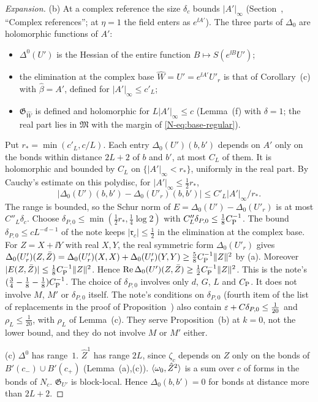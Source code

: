 \begin{proof}[Expansion]
(b) At a complex reference the size $\delta_c$ bounds $|A'|_\infty$ (Section~, ``Complex references''; at $\eta=1$ the field enters as $e^{\ii A'}$). The three parts of $\Delta_0$ are holomorphic functions of $A'$:
\begin{itemize}
\item $\Delta^0(U')$ is the Hessian of the entire function $B\mapsto S(e^{\ii B}U')$;
\item the elimination at the complex base $\hat W=U'=e^{\ii A'}U'_r$ is that of Corollary~(c) with $\hat\beta=A'$, defined for $|A'|_\infty\le c'_L$;
\item $\mathfrak G_{\hat W}$ is defined and holomorphic for $L|A'|_\infty\le c$ (Lemma~(f) with $\delta=1$; the real part lies in $\mathfrak M$ with the margin of \eqref{N-eq:base-regular}).
\end{itemize}
Put $r_*=\min(c'_L,c/L)$. Each entry $\Delta_0(U')(b,b')$ depends on $A'$ only on the bonds within distance $2L+2$ of $b$ and $b'$, at most $C_L$ of them. It is holomorphic and bounded by $C_L$ on $\{|A'|_\infty<r_*\}$, uniformly in the real part. By Cauchy's estimate on this polydisc, for $|A'|_\infty\le\frac12r_*$,
\[
|\Delta_0(U')(b,b')-\Delta_0(U'_r)(b,b')|\le C'_L|A'|_\infty/r_* .
\]
The range is bounded, so the Schur norm of $E=\Delta_0(U')-\Delta_0(U'_r)$ is at most $C''_L\delta_c$. Choose $\delta_{P,0}\le\min(\frac12r_*,\frac14\log2)$ with $C''_L\delta_{P,0}\le\frac18C_{\rm P}^{-1}$. The bound $\delta_{P,0}\le cL^{-d-1}$ of the note keeps $|\mathfrak r_c|\le\frac12$ in the elimination at the complex base. For $Z=X+\ii Y$ with real $X,Y$, the real symmetric form $\Delta_0(U'_r)$ gives $\Delta_0(U'_r)(Z,\bar Z)=\Delta_0(U'_r)(X,X)+\Delta_0(U'_r)(Y,Y)\ge\frac58C_{\rm P}^{-1}\|Z\|^2$ by (a). Moreover $|E(Z,\bar Z)|\le\frac18C_{\rm P}^{-1}\|Z\|^2$. Hence $\operatorname{Re}\Delta_0(U')(Z,\bar Z)\ge\frac12C_{\rm P}^{-1}\|Z\|^2$. This is the note's $(\frac34-\frac18-\frac18)C_{\rm P}^{-1}$. The choice of $\delta_{P,0}$ involves only $d$, $G$, $L$ and $C_{\rm P}$. It does not involve $M$, $M'$ or $\delta_{P,0}$ itself. The note's conditions on $\delta_{P,0}$ (fourth item of the list of replacements in the proof of Proposition~) also contain $\varepsilon+C\delta_{P,0}\le\frac1{20}$ and $\rho_L\le\frac1{20}$, with $\rho_L$ of Lemma~(c). They serve Proposition~(b) at $k=0$, not the lower bound, and they do not involve $M$ or $M'$ either.

(c) $\Delta^0$ has range~$1$. $\hat Z^1$ has range $2L$, since $\zeta_c$ depends on $Z$ only on the bonds of $B'(c_-)\cup B'(c_+)$ (Lemma~(a),(c)). $\langle \omega_0,\hat Z^2\rangle$ is a sum over $c$ of forms in the bonds of $N_c$. $\mathfrak G_{U'}$ is block-local. Hence $\Delta_0(b,b')=0$ for bonds at distance more than $2L+2$.
\end{proof}

